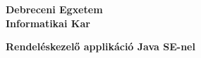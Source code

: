 \begin{titlepage}
	\begin{center}
		\vspace*{1cm}
		
		\textbf{\large{Debreceni Egxetem \\ Informatikai Kar}}
		
		\vfill
		
		\textbf{Rendeléskezelő applikáció Java SE-nel}
		
		\vfill
		
		\begin{parcolumns}[colwidths={1=.4\linewidth}]{2}
		\end{parcolumns}
		
	\end{center}
\end{titlepage}